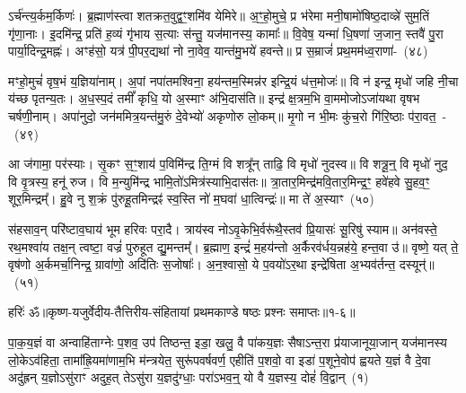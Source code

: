ऽर्च॑न्त्य॒र्कम॒र्किणः॑। ब्र॒ह्माण॑स्त्वा शतक्रत॒वुद्व॒ꣳ॒शमि॑व येमिरे॥ अ॒ꣳ॒हो॒मुचे॒ प्र भ॑रेमा मनी॒षामो॑षिष्ठ॒दाव्न्ने॑ सुम॒तिं गृ॑णा॒नाः। इ॒दमि॑न्द्र॒ प्रति॑ ह॒व्यं गृ॑भाय स॒त्याः स॑न्तु॒ यज॑मानस्य॒ कामाः᳚॥ वि॒वेष॒ यन्मा॑ धि॒षणा॑ ज॒जान॒ स्तवै॑ पु॒रा पार्या॒दिन्द्र॒मह्नः॑। अꣳह॑सो॒ यत्र॑ पी॒पर॒द्यथा॑ नो ना॒वेव॒ यान्त॑मु॒भये॑ हवन्ते॥ प्र स॒म्राजं॑ प्रथ॒मम॑ध्व॒राणा॑-~(४८)\ip

मꣳहो॒मुचं॑ वृष॒भं य॒ज्ञिया॑नाम्। अ॒पां नपा॑तमश्विना॒ हय॑न्तम॒स्मिन्न॑र इन्द्रि॒यं ध॑त्त॒मोजः॑॥ वि न॑ इन्द्र॒ मृधो॑ जहि नी॒चा य॑च्छ पृतन्य॒तः। अ॒ध॒स्प॒दं तमीं᳚ कृधि॒ यो अ॒स्माꣳ अ॑भि॒दास॑ति॥ इन्द्र॑ क्ष॒त्रम॒भि वा॒ममोजो\-ऽजा॑यथा वृषभ चर्\mbox{}षणी॒नाम्। अपा॑नुदो॒ जन॑ममित्र॒यन्त॑मु॒रुं दे॒वेभ्यो॑ अकृणोरु लो॒कम्॥ मृ॒गो न भी॒मः कु॑च॒रो गि॑रि॒ष्ठाः प॑रा॒वत॒~-~(४९)\ip

आ ज॑गामा॒ पर॑स्याः। सृ॒कꣳ स॒ꣳ॒शाय॑ प॒विमि॑न्द्र ति॒ग्मं वि शत्रू᳚न् ताढि॒ वि मृधो॑ नुदस्व॥ वि शत्रू॒न्॒ वि मृधो॑ नुद॒ वि वृ॒त्रस्य॒ हनू॑ रुज। वि म॒न्युमि॑न्द्र भामि॒तो॑\-ऽमित्र॑स्याभि॒दास॑तः॥ त्रा॒तार॒मिन्द्र॑मवि॒तार॒मिन्द्र॒ꣳ॒ हवे॑हवे सु॒हव॒ꣳ॒ शूर॒मिन्द्रम्᳚। हु॒वे नु श॒क्रं पु॑रुहू॒तमिन्द्रꣴ॑ स्व॒स्ति नो॑ म॒घवा॑ धा॒त्विन्द्रः॑॥ मा ते॑ अ॒स्याꣳ~(५०)\ip

स॑हसाव॒न् परि॑ष्टाव॒घाय॑ भूम हरिवः परा॒दै। त्राय॑स्व नो\-ऽवृ॒केभि॒र्वरू॑थै॒स्तव॑ प्रि॒यासः॑ सू॒रिषु॑ स्याम॥ अन॑वस्ते॒ रथ॒मश्वा॑य तक्ष॒न् त्वष्टा॒ वज्रं॑ पुरुहूत द्यु॒मन्तम्᳚। ब्र॒ह्माण॒ इन्द्रं॑ म॒हय॑न्तो अ॒र्कैरव॑र्धय॒न्नह॑ये॒ हन्त॒वा उ॑॥ वृष्णे॒ यत् ते॒ वृष॑णो अ॒र्कमर्चा॒निन्द्र॒ ग्रावा॑णो॒ अदि॑तिः स॒जोषाः᳚। अ॒न॒श्वासो॒ ये प॒वयो॑\-ऽर॒था इन्द्रे॑षिता अ॒भ्यव॑र्तन्त॒ दस्यून्॑॥~(५१)\ip

{\anuvakamend[{वृ॒त्र॒हत्ये\-ऽनु॑ गाय॒त्रिणो᳚\-ऽध्व॒राणां᳚ परा॒वतो॒\-ऽस्याम॒ष्टाच॑त्वारिꣳशच्च}]}%

{हरिः॑ ॐ}{॥कृष्ण-यजुर्वेदीय-तैत्तिरीय-संहितायां प्रथमकाण्डे षष्ठः प्रश्नः समाप्तः॥१-६॥}



\setcounter{anuvakam}{0}
पा॒क॒य॒ज्ञं वा अन्वाहि॑ताग्नेः प॒शव॒ उप॑ तिष्ठन्त॒ इडा॒ खलु॒ वै पा॑कय॒ज्ञः सैषा\-ऽन्त॒रा प्र॑याजानूया॒जान् यज॑मानस्य लो॒के\-ऽव॑हिता॒ तामा᳚ह्रि॒यमा॑णाम॒भि म॑न्त्रयेत॒ सुरू॑पवर्\mbox{}षवर्ण॒ एहीति॑ प॒शवो॒ वा इडा॑ प॒शूने॒वोप॑ ह्वयते य॒ज्ञं वै दे॒वा अदु॑ह्रन् य॒ज्ञो\-ऽसु॑राꣳ अदुह॒त् ते\-ऽसु॑रा य॒ज्ञदु॑ग्धाः॒ परा॑\-ऽभव॒न्॒ यो वै य॒ज्ञस्य॒ दोहं॑ वि॒द्वान्~(१)\ip

